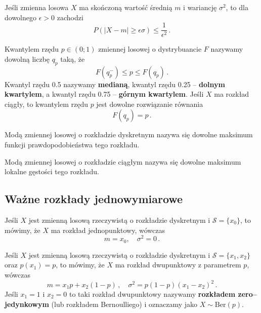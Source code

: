 \documentclass{myclass}
\numberwithin{equation}{subsection}
\begin{document}
\begin{theorem}
Jeśli zmienna losowa \(X\) ma skończoną wartość średnią \(m\) i wariancję \(\sigma^2\), to dla
dowolnego \(\epsilon > 0\) zachodzi
\begin{equation*}
    P(|X - m| \geq \epsilon\sigma) \leq \frac{1}{\epsilon^2}\,.
\end{equation*}
\end{theorem}

\begin{definition}[Kwantyla]
Kwantylem rzędu \(p \in (0;1)\) zmiennej losowej o dystrybuancie \(F\) nazywamy dowolną liczbę
\(q_p\) taką, że
\begin{equation*}
    F(q_p^-) \leq p \leq F(q_p)\,.
\end{equation*}
Kwantyl rzędu 0.5 nazywamy \textbf{medianą}, kwantyl rzędu 0.25 -- \textbf{dolnym kwartylem},
a kwantyl rzędu 0.75 -- \textbf{górnym kwartylem}. Jeśli \(X\) ma rozkład ciągły, to kwantylem
rzędu \(p\) jest dowolne rozwiązanie równania
\begin{equation*}
    F(q_p) = p\,.
\end{equation*}
\end{definition}

\begin{definition}[Mody]
Modą zmiennej losowej o rozkładzie dyskretnym nazywa się dowolne maksimum funkcji prawdopodobieństwa
tego rozkładu.

Modą zmiennej losowej o rozkładzie ciągłym nazywa się dowolne maksimum lokalne gęstości tego
rozkładu.
\end{definition}


\subsection{Ważne rozkłady jednowymiarowe}

\begin{definition}
Jeśli \(X\) jest zmienną losową rzeczywistą o rozkładzie dyskretnym i \(\mathcal{S} = \{x_0\}\), to
mówimy, że \(X\) ma rozkład jednopunktowy, wówczas
\begin{equation*}
    m = x_0,\quad \sigma^2 = 0\,.
\end{equation*}
\end{definition}

\begin{definition}
Jeśli \(X\) jest zmienną losową rzeczywistą o rozkładzie dyskretnym i \(\mathcal{S} = \{x_1, x_2\}\)
oraz \(p(x_1) = p\), to mówimy, że \(X\) ma rozkład dwupunktowy z parametrem \(p\), wówczas
\begin{equation*}
    m = x_1 p + x_2 (1 - p)\,,\quad \sigma^2 = p (1 - p) (x_1 - x_2)^2\,.
\end{equation*}
Jeśli \(x_1 = 1\) i \(x_2 = 0\) to taki rozkład dwupunktowy nazywamy \textbf{rozkładem
zero--jedynkowym} (lub rozkładem Bernoulliego) i oznaczamy jako \(X \sim \mathrm{Ber}(p)\).
\end{definition}
\end{document}
